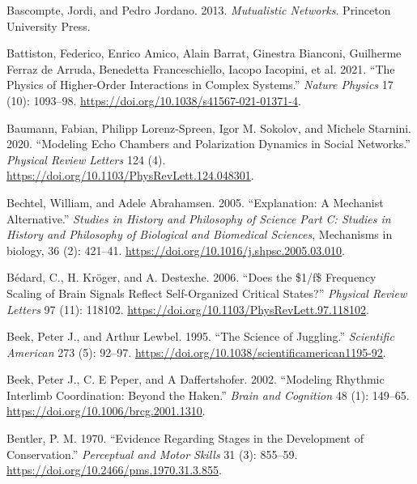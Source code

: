 \documentclass[
  a4paper,
  DIV=11,
  numbers=noendperiod,
  oneside]{scrreprt}
\newlength{\cslhangindent}
\newenvironment{CSLReferences}[2] %
 {\begin{list}{}{%
  \setlength{\itemindent}{0pt}
  \setlength{\leftmargin}{0pt}
  \setlength{\parsep}{0pt}
  \ifodd #1
   \setlength{\leftmargin}{\cslhangindent}
   \setlength{\itemindent}{-1\cslhangindent}
  \fi
  \setlength{\itemsep}{#2\baselineskip}}}
 {\end{list}}
\begin{document}
\begin{CSLReferences}{1}{0}
Bascompte, Jordi, and Pedro Jordano. 2013. \emph{Mutualistic
{Networks}}. {Princeton University Press}.

Battiston, Federico, Enrico Amico, Alain Barrat, Ginestra Bianconi,
Guilherme Ferraz de Arruda, Benedetta Franceschiello, Iacopo Iacopini,
et al. 2021. {``The Physics of Higher-Order Interactions in Complex
Systems.''} \emph{Nature Physics} 17 (10): 1093--98.
\url{https://doi.org/10.1038/s41567-021-01371-4}.

Baumann, Fabian, Philipp Lorenz-Spreen, Igor M. Sokolov, and Michele
Starnini. 2020. {``Modeling {Echo Chambers} and {Polarization Dynamics}
in {Social Networks}.''} \emph{Physical Review Letters} 124 (4).
\url{https://doi.org/10.1103/PhysRevLett.124.048301}.

Bechtel, William, and Adele Abrahamsen. 2005. {``Explanation: A
Mechanist Alternative.''} \emph{Studies in History and Philosophy of
Science Part C: Studies in History and Philosophy of Biological and
Biomedical Sciences}, Mechanisms in biology, 36 (2): 421--41.
\url{https://doi.org/10.1016/j.shpsc.2005.03.010}.

Bédard, C., H. Kröger, and A. Destexhe. 2006. {``Does the \$1/f\$
{Frequency Scaling} of {Brain Signals Reflect Self-Organized Critical
States}?''} \emph{Physical Review Letters} 97 (11): 118102.
\url{https://doi.org/10.1103/PhysRevLett.97.118102}.

Beek, Peter J., and Arthur Lewbel. 1995. {``The {Science} of
{Juggling}.''} \emph{Scientific American} 273 (5): 92--97.
\url{https://doi.org/10.1038/scientificamerican1195-92}.

Beek, Peter J., C. E Peper, and A Daffertshofer. 2002. {``Modeling
{Rhythmic Interlimb Coordination}: {Beyond} the
{Haken}.''} \emph{Brain and
Cognition} 48 (1): 149--65.
\url{https://doi.org/10.1006/brcg.2001.1310}.

Bentler, P. M. 1970. {``Evidence Regarding {Stages} in the {Development}
of {Conservation}.''} \emph{Perceptual and Motor Skills} 31 (3):
855--59. \url{https://doi.org/10.2466/pms.1970.31.3.855}.


\end{CSLReferences}
\end{document}
